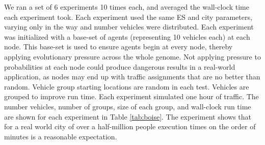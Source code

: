 \documentclass{sig-alternate-05-2015}
\begin{document}
We ran a set of 6 experiments 10 times each, and averaged the wall-clock
time each experiment took. Each experiment used the same ES and city
parameters, varying only in the way and number vehicles were distributed.
Each experiment was initialized with a base-set of agents (representing 10
vehicles each) at each node. This base-set is used to ensure agents
begin at every node, thereby applying evolutionary pressure across the
whole genome. Not applying pressure to probabilities at each node
could produce dangerous results in a real-world application, as nodes
may end up with traffic assignments that are no better than random.
Vehicle group starting locations are random in each test.
Vehicles are grouped to improve run time. Each experiment simulated
one hour of traffic. The number vehicles, number of groups, size of
each group, and wall-clock run time are shown for each experiment
in Table \ref{tab:boise}.   The experiment shows that for a
real world city of over a half-million people execution times on
the order of minutes is a reasonable expectation.

\end{document}
